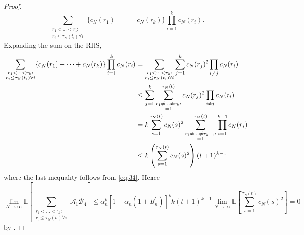 \documentclass{article}
\newcommand{\E}{\mathbb{E}}
\newcommand{\1}[1]{\mathbbm{1}_{#1}}
\begin{document}
\begin{proof}
\begin{equation}
\sum_{\substack{r_1 <\dots< r_k :\\ r_i \leq \tau_N(t_i) \forall i}}
\{ c_N(r_1) + \cdots + c_N(r_k) \}
\prod_{i=1}^k  c_N(r_i) .
\end{equation}
Expanding the sum on the RHS,
\begin{align}
\sum_{\substack{r_1 <\dots< r_k :\\ r_i \leq \tau_N(t_i) \forall i}}
\{ c_N(r_1) + \cdots + c_N(r_k) \}
\prod_{i=1}^k  c_N(r_i)
&= \sum_{\substack{r_1 <\dots< r_k :\\ r_i \leq \tau_N(t_i) \forall i}}
\sum_{j=1}^k c_N(r_j)^2 \prod_{i\neq j} c_N(r_i) \notag\\
&\leq \sum_{j=1}^k \sum_{\substack{r_1 \neq \dots \neq r_k :\\ =1}}^{\tau_N(t)} c_N(r_j)^2 \prod_{i\neq j} c_N(r_i) \notag\\
&= k \sum_{s=1}^{\tau_N(t)} c_N(s)^2
\sum_{\substack{r_1 \neq \dots \neq r_{k-1} :\\ =1}}^{\tau_N(t)} \prod_{i=1}^{k-1} c_N(r_i) \notag\\
&\leq k \left( \sum_{s=1}^{\tau_N(t)} c_N(s)^2 \right) (t+1)^{k-1}
\end{align}
where the last inequality follows from \eqref{eq:34}.
Hence
\begin{equation}
\lim_{N\to\infty}\E\left[ \sum_{\substack{r_1 <\dots< r_k :\\ r_i \leq \tau_N(t_i) \forall i}} \mathscr{A}_1 \mathscr{B}_4 \right]
\leq \alpha_n^k \left[ 1 + \alpha_n (1 + B_n^\prime) \right]^k
k (t+1)^{k-1} \lim_{N\to\infty}\E\left[ \sum_{s=1}^{\tau_N(t)} c_N(s)^2 \right] =0
\end{equation}
by \citet[Equation (4)]{brown2020}.


\end{proof}
\end{document}
